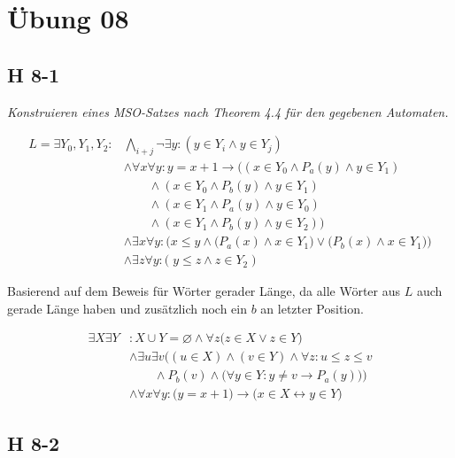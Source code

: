 \documentclass{scrartcl}
\begin{document}
\section{Übung 08}

\subsection{H 8-1}

\textsl{Konstruieren eines MSO-Satzes nach Theorem 4.4 für den gegebenen Automaten.}

\begin{align*}
L = \exists Y_0, Y_1, Y_2 : &\bigwedge_{i+j} \lnot \exists y : \left( y \in Y_i \land y \in Y_j \right)\\
    &\land \forall x \forall y : y = x + 1 \rightarrow \Big((x \in  Y_0 \land P_a(y) \land y \in Y_1)\\
        &\qquad \land (x \in Y_0 \land P_b(y) \land y \in Y_1)\\
        &\qquad \land (x \in Y_1 \land P_a(y) \land y \in Y_0)\\
        &\qquad \land (x \in Y_1 \land P_b(y) \land y \in Y_2) \Big)\\
    &\land \exists x \forall y : \Big( x \leq y \land \big( P_a(x) \land x \in Y_1 \big) \lor \big(P_b(x) \land x \in  Y_1 \big) \Big)\\
    &\land \exists z \forall y : \big(\;y \leq z \land z \in Y_2 \;\big)
\end{align*}

Basierend auf dem Beweis für Wörter gerader Länge, da alle Wörter aus $L$ auch gerade Länge haben und zusätzlich noch ein $b$ an letzter Position.

\begin{align*}
\exists X \exists Y &: X \cup Y = \varnothing \land \forall z \big( z \in X \lor z \in Y \big)\\
    &\land \exists u \exists v \Big( (u \in X ) \land ( v \in Y ) \land \forall z : u \leq z \leq v\\
    &\qquad \land P_b(v) \land \big( \forall y \in Y : y \neq v \rightarrow P_a(y) \big) \Big)\\
    &\land \forall x \forall y  : \big( y = x + 1 \big) \rightarrow \big( x \in X \leftrightarrow y \in Y \big)
\end{align*}

\subsection{H 8-2}
\end{document}
